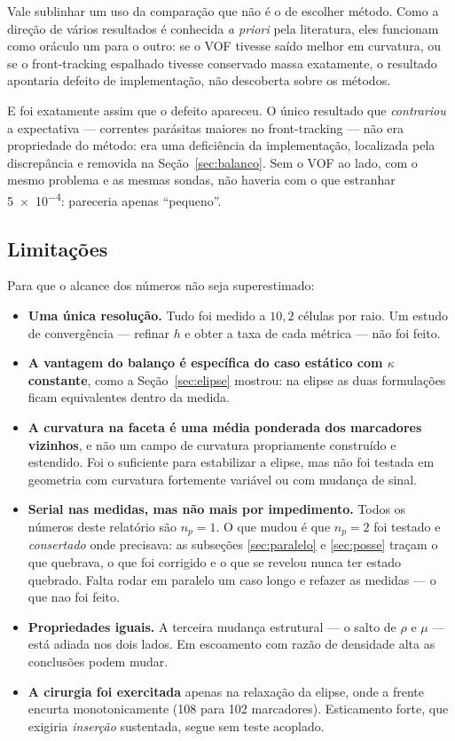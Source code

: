 Vale sublinhar um uso da compara\c{c}\~ao que n\~ao \'e o de escolher m\'etodo.
Como a dire\c{c}\~ao de v\'arios resultados \'e conhecida \emph{a priori} pela
literatura, eles funcionam como or\'aculo um para o outro: se o VOF tivesse
sa\'ido melhor em curvatura, ou se o front-tracking espalhado tivesse conservado
massa exatamente, o resultado apontaria defeito de implementa\c{c}\~ao, n\~ao
descoberta sobre os m\'etodos.

E foi exatamente assim que o defeito apareceu. O \'unico resultado que
\emph{contrariou} a expectativa --- correntes par\'asitas maiores no
front-tracking --- n\~ao era propriedade do m\'etodo: era uma deficiência da
implementa\c{c}\~ao, localizada pela discrep\^ancia e removida na
Se\c{c}\~ao~\ref{sec:balanco}. Sem o VOF ao lado, com o mesmo problema e as
mesmas sondas, n\~ao haveria com o que estranhar \num{5e-4}: pareceria apenas
``pequeno''.

\subsection{Limita\c{c}\~oes}

Para que o alcance dos n\'umeros n\~ao seja superestimado:

\begin{itemize}
  \item \textbf{Uma \'unica resolu\c{c}\~ao.} Tudo foi medido a $10{,}2$
    c\'elulas por raio. Um estudo de converg\^encia --- refinar $h$ e obter a
    taxa de cada m\'etrica --- n\~ao foi feito.
  \item \textbf{A vantagem do balan\c{c}o \'e espec\'ifica do caso est\'atico
    com $\kappa$ constante}, como a Se\c{c}\~ao~\ref{sec:elipse} mostrou: na
    elipse as duas formula\c{c}\~oes ficam equivalentes dentro da medida.
  \item \textbf{A curvatura na faceta \'e uma m\'edia ponderada dos marcadores
    vizinhos}, e n\~ao um campo de curvatura propriamente constru\'ido e
    estendido. Foi o suficiente para estabilizar a elipse, mas n\~ao foi testada
    em geometria com curvatura fortemente vari\'avel ou com mudan\c{c}a de
    sinal.
  \item \textbf{Serial nas medidas, mas n\~ao mais por impedimento.} Todos os
    n\'umeros deste relat\'orio s\~ao $n_p=1$. O que mudou \'e que $n_p=2$ foi
    testado e \emph{consertado} onde precisava: as subse\c{c}\~oes
    \ref{sec:paralelo} e \ref{sec:posse} tra\c{c}am o que quebrava, o que foi
    corrigido e o que se revelou nunca ter estado quebrado. Falta rodar em
    paralelo um caso longo e refazer as medidas --- o que nao foi feito.
  \item \textbf{Propriedades iguais.} A terceira mudan\c{c}a estrutural --- o
    salto de $\rho$ e $\mu$ --- est\'a adiada nos dois lados. Em escoamento com
    raz\~ao de densidade alta as conclus\~oes podem mudar.
  \item \textbf{A cirurgia foi exercitada} apenas na relaxa\c{c}\~ao da elipse,
    onde a frente encurta monotonicamente (108 para 102 marcadores). Esticamento
    forte, que exigiria \emph{inser\c{c}\~ao} sustentada, segue sem teste
    acoplado.
\end{itemize}

